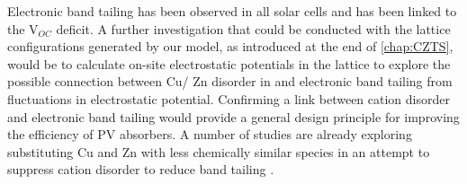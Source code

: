 \documentclass[11pt, twoside]{report}
\begin{document}


Electronic band tailing has been observed in all {\CZTS} solar cells and has been linked to the V$_{OC}$ deficit.
A further investigation that could be conducted with the lattice configurations generated by our model, as introduced at the end of \autoref{chap:CZTS}, would be to calculate on-site electrostatic potentials in the lattice to explore the possible connection between Cu/ Zn disorder in {\CZTS} and electronic band tailing from fluctuations in electrostatic potential. Confirming a link between cation disorder and electronic band tailing would provide a general design principle for improving the efficiency of PV absorbers. A number of studies are already exploring substituting Cu and Zn with less chemically similar species in an attempt to suppress cation disorder to reduce band tailing \cite{Gerschon_AZTSe, distant_cations, Tong_Ba-CZTS}. 
\end{document}
